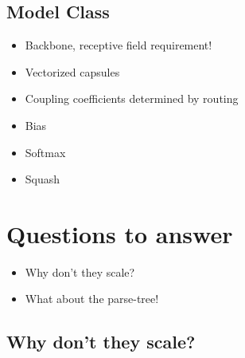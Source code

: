 \documentclass{article}
\begin{document}
\subsection*{Model Class}
\begin{itemize}
	\item Backbone, receptive field requirement!
	\item Vectorized capsules
	\item Coupling coefficients determined by routing
	\item Bias
	\item Softmax
	\item Squash
\end{itemize}


\section{Questions to answer}
\begin{itemize}
	\item Why don't they scale?
	\item What about the parse-tree!
\end{itemize}

\subsection{Why don't they scale?}
\end{document}
